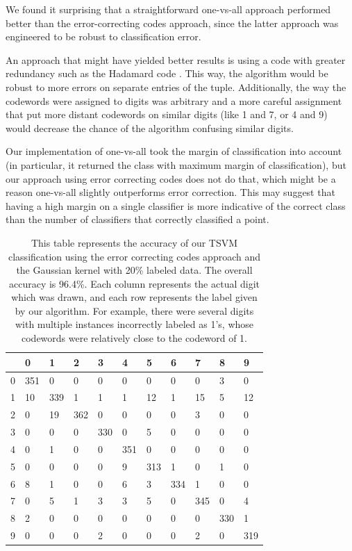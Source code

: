 \documentclass[11pt]{article}
\begin{document}
We found it surprising that a straightforward one-vs-all
approach performed better than the error-correcting codes approach,
since the latter approach was engineered to be robust to classification
error.

An approach that might have yielded better results is
using a code with greater redundancy such as the Hadamard
code \cite{macwilliams1977theory}.
This way, the algorithm would be robust to more errors on separate entries
of the tuple.
Additionally, the way the codewords were assigned to digits was arbitrary
and a more careful assignment that put more distant codewords on
similar digits (like 1 and 7, or 4 and 9) would decrease the chance
of the algorithm confusing similar digits.

Our implementation of one-vs-all took the margin of classification
into account (in particular, it returned the class with maximum margin of
classification), but our approach using error correcting codes does not do that,
which might be a reason one-vs-all slightly 
outperforms error correction. This may suggest that having a high margin
on a single classifier is more indicative of the correct class than
the number of classifiers that correctly classified a point.

\begin{table}[]
  \centering
  \caption{This table represents the accuracy of our TSVM classification using
  the error correcting codes approach and the Gaussian kernel
 with 20\% labeled data. The overall accuracy is 96.4\%. Each column represents the actual digit which was drawn, and each row represents the label given by our algorithm. For example, there were several digits with multiple instances
  incorrectly labeled as 1's, whose codewords were relatively close to the
  codeword of 1.}
  \label{my-table}
  \vspace{.3in}
  \begin{tabular}{l|llllllllll}
    & 0 & 1 & 2 & 3 & 4 & 5 & 6 & 7 & 8 & 9\\\hline
    0 &351 & 0   & 0   & 0   & 0   & 0   & 0   & 0   & 3   & 0   \\
    1 &10   & 339 & 1  & 1   & 1   & 12   & 1   & 15  & 5   & 12  \\
    2 & 0   & 19  & 362 & 0   & 0   & 0   & 0   & 3   & 0   & 0   \\
    3 & 0   & 0   & 0   & 330 & 0   & 5  & 0   & 0   & 0   & 0   \\
    4 & 0   & 1   & 0   & 0   & 351 & 0   & 0   & 0  & 0   & 0   \\
    5 & 0   & 0  & 0   & 0   & 9  & 313 & 1   & 0   & 1  & 0  \\
    6 & 8   & 1   & 0   & 0   & 6   & 3   & 334 & 1   & 0   & 0   \\
    7 & 0   & 5   & 1   & 3   & 3   & 5   & 0   & 345 & 0   & 4   \\
    8 & 2  & 0   & 0   & 0   & 0   & 0   & 0   & 0   & 330 & 1   \\
    9 & 0   & 0   & 0   & 2   & 0  & 0  & 0   & 2   & 0   & 319
  \end{tabular}
  \end{table}
\end{document}
